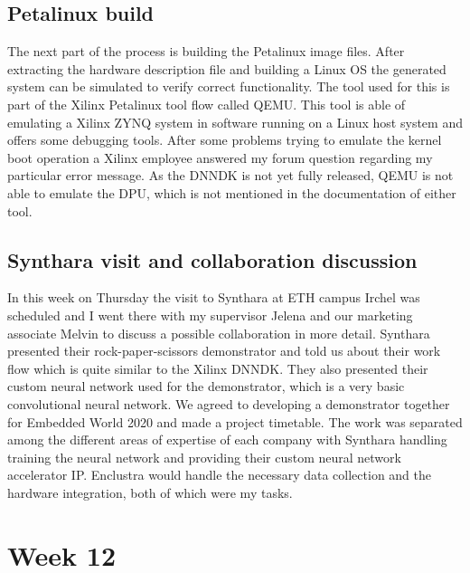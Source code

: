 \subsection{Petalinux build}
The next part of the process is building the Petalinux image files. After extracting the hardware description file and building a Linux \ac{OS} the generated system can be simulated to verify correct functionality. The tool used for this is part of the Xilinx Petalinux tool flow called \ac{QEMU}. This tool is able of emulating a Xilinx ZYNQ system in software running on a Linux host system and offers some debugging tools. After some problems trying to emulate the kernel boot operation a Xilinx employee answered my forum question regarding my particular error message. As the \ac{DNNDK} is not yet fully released, \ac{QEMU} is not able to emulate the \ac{DPU}, which is not mentioned in the documentation of either tool.
\subsection{Synthara visit and collaboration discussion}
In this week on Thursday the visit to Synthara at ETH campus Irchel was scheduled and I went there with my supervisor Jelena and our marketing associate Melvin to discuss a possible collaboration in more detail. Synthara presented their rock-paper-scissors demonstrator and told us about their work flow which is quite similar to the Xilinx \ac{DNNDK}. They also presented their custom neural network used for the demonstrator, which is a very basic convolutional neural network. We agreed to developing a demonstrator together for Embedded World 2020 and made a project timetable. The work was separated among the different areas of expertise of each company with Synthara handling training the neural network and providing their custom neural network accelerator \ac{IP}. Enclustra would handle the necessary data collection and the hardware integration, both of which were my tasks.

\section{Week 12}
